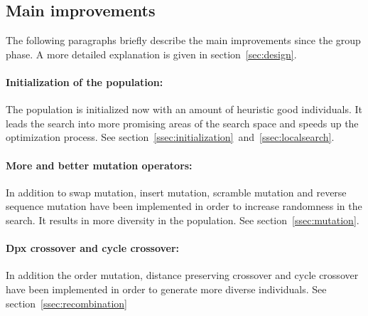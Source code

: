 \documentclass[a4paper,10pt]{article}
\newcommand{\ReplaceMe}[1]{{\color{blue}#1}}
\newcommand{\RemoveMe}[1]{{\color{purple}#1}}
\begin{document}

\subsection{Main improvements}

The following paragraphs briefly describe the main improvements since the group phase. A more detailed explanation is given in section~\ref{sec:design}.


\paragraph{Initialization of the population:} The population is initialized now with an amount of heuristic good individuals. It leads the search into more promising areas of the search space and speeds up the optimization process. See section~\ref{ssec:initialization}~and~\ref{ssec:localsearch}.
\paragraph{More and better mutation operators:} In addition to swap mutation, insert mutation, scramble mutation and reverse sequence mutation have been implemented in order to increase randomness in the search. It results in more diversity in the population. See section~\ref{ssec:mutation}.
\paragraph{Dpx crossover and cycle crossover:} In addition the order mutation, distance preserving crossover and cycle crossover have been implemented in order to generate more diverse individuals. See section~\ref{ssec:recombination}
\end{document}

